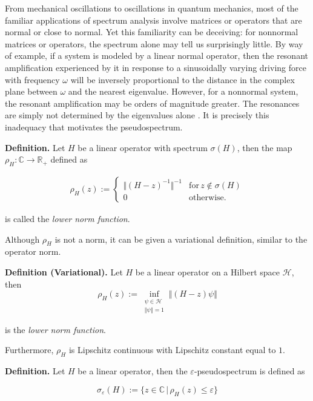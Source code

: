 \documentclass[11pt]{article}
\begin{document}
From mechanical oscillations to oscillations in quantum mechanics, most of the familiar applications of spectrum analysis involve matrices or operators that are normal or close to normal. Yet this familiarity can be deceiving: for nonnormal matrices or operators, the spectrum alone may tell us surprisingly little. By way of example, if a system is modeled by a linear normal operator, then the resonant amplification experienced by it in response to a sinusoidally varying driving force with frequency $\omega$ will be inversely proportional to the distance in the complex plane between $\omega$ and the nearest eigenvalue. However, for a nonnormal system, the resonant amplification may be orders of magnitude greater. The resonances are simply not determined by the eigenvalues alone \cite{pseudospectra}. It is precisely this inadequacy that motivates the pseudospectrum.

\textbf{Definition.} Let $H$ be a linear operator with spectrum $\sigma(H)$, then the map $\rho_H: \mathbb{C} \rightarrow \mathbb{R}_+$ defined as

\begin{align}
    \rho_H (z) := \begin{cases}
        \Vert (H - z)^{-1} \Vert^{-1} & \text{for} \, z \notin \sigma(H) \\
        0 & \text{otherwise.}
    \end{cases} 
\end{align}

is called the \textit{lower norm function}.

Although $\rho_H$ is not a norm, it can be given a variational definition, similar to the operator norm.

\textbf{Definition (Variational).} Let $H$ be a linear operator on a Hilbert space $\mathcal{H}$, then
\begin{equation} \label{eq:lower_norm_function}
    \rho_H(z) := \inf_{\substack{\psi \in \mathcal{H} \\ \Vert \psi \Vert = 1}} \Vert (H - z) \psi \Vert
\end{equation}

is the \textit{lower norm function}.

Furthermore, $\rho_H$ is Lipschitz continuous with Lipschitz constant equal to $1$.

\textbf{Definition.} Let $H$ be a linear operator, then the $\varepsilon$-pseudospectrum is defined as

\begin{equation}
    \sigma_{\varepsilon} (H) := \{ z \in \mathbb{C} \, \vert \, \rho_H (z) \leq \varepsilon \} 
\end{equation}
\end{document}
